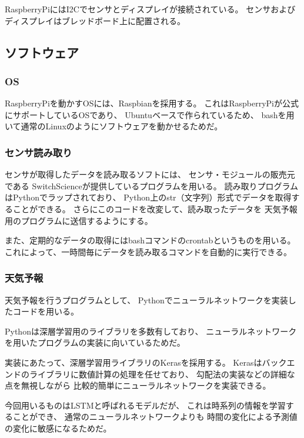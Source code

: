 \documentclass{jsarticle}
\begin{document}
				RaspberryPiにはI2Cでセンサとディスプレイが接続されている。
				センサおよびディスプレイはブレッドボード上に配置される。
				
		
			\subsection{ソフトウェア}
			
				\subsubsection{OS}
				
					RaspberryPiを動かすOSには、Raspbianを採用する。
					これはRaspberryPiが公式にサポートしているOSであり、
					Ubuntuベースで作られているため、
					bashを用いて通常のLinuxのようにソフトウェアを動かせるためだ。
					
				\subsubsection{センサ読み取り}
				
					センサが取得したデータを読み取るソフトには、
					センサ・モジュールの販売元である
					SwitchScienceが提供しているプログラムを用いる。
					読み取りプログラムはPythonでラップされており、
					Python上のstr（文字列）形式でデータを取得することができる。
					さらにこのコードを改変して、読み取ったデータを
					天気予報用のプログラムに送信するようにする。
					
					また、定期的なデータの取得にはbashコマンドのcrontabというものを用いる。
					これによって、一時間毎にデータを読み取るコマンドを自動的に実行できる。
					
				\subsubsection{天気予報}
				
					天気予報を行うプログラムとして、
					Pythonでニューラルネットワークを実装したコードを用いる。
					
					Pythonは深層学習用のライブラリを多数有しており、
					ニューラルネットワークを用いたプログラムの実装に向いているためだ。
					
					実装にあたって、深層学習用ライブラリのKerasを採用する。
					Kerasはバックエンドのライブラリに数値計算の処理を任せており、
					勾配法の実装などの詳細な点を無視しながら
					比較的簡単にニューラルネットワークを実装できる。
					
					今回用いるものはLSTM\cite{Hochreiter}と呼ばれるモデルだが、
					これは時系列の情報を学習することができ、
					通常のニューラルネットワークよりも
					時間の変化による予測値の変化に敏感になるためだ。
					
\end{document}
